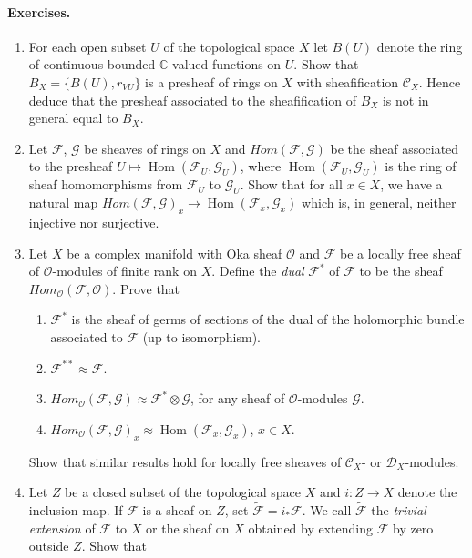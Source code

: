 \paragraph{Exercises.}
\begin{enumerate}
\item For each open subset $U$ of the topological space $X$ let $B(U)$ denote the ring of continuous bounded $\mathbb C$-valued functions on $U$. Show that $B_X=\{B(U),r_{VU}\}$ is a presheaf of rings on $X$ with sheafification $\mathcal C_X$. Hence deduce that the presheaf associated to the sheafification of $B_X$ is not in general equal to $B_X$.
\item Let $\mathcal F$, $\mathcal G$ be sheaves of rings on $X$ and $\mathit{Hom}(\mathcal F,\mathcal G)$ be the sheaf associated to the presheaf $U\mapsto\operatorname{Hom}(\mathcal F_U,\mathcal G_U)$, where $\operatorname{Hom}(\mathcal F_U,\mathcal G_U)$ is the ring of sheaf homomorphisms from $\mathcal F_U$ to $\mathcal G_U$. Show that for all $x\in X$, we have a natural map $\mathit{Hom}(\mathcal F,\mathcal G)_x\to\operatorname{Hom}(\mathcal F_x,\mathcal G_x)$ which is, in general, neither injective nor surjective.
\item Let $X$ be a complex manifold with Oka sheaf $\mathcal O$ and $\mathcal F$ be a locally free sheaf of $\mathcal O$-modules of finite rank on $X$. Define the \emph{dual} $\mathcal F^*$ of $\mathcal F$ to be the sheaf $\mathit{Hom}_{\mathcal O}(\mathcal F,\mathcal O)$. Prove that
\begin{enumerate}[label=\Alph*)]
\item $\mathcal F^*$ is the sheaf of germs of sections of the dual of the holomorphic bundle associated to $\mathcal F$ (up to isomorphism).
\item $\mathcal F^{**}\approx\mathcal F$.
\item $\mathit{Hom}_{\mathcal O}(\mathcal F,\mathcal G)\approx\mathcal F^*\otimes\mathcal G$, for any sheaf of $\mathcal O$-modules $\mathcal G$.
\item $\mathit{Hom}_{\mathcal O}(\mathcal F,\mathcal G)_x\approx\operatorname{Hom}(\mathcal F_x,\mathcal G_x)$, $x\in X$.
\end{enumerate}
Show that similar results hold for locally free sheaves of $\mathcal C_X$- or $\mathscr D_X$-modules.
\item Let $Z$ be a closed subset of the topological space $X$ and $i:Z\to X$ denote the inclusion map. If $\mathcal F$ is a sheaf on $Z$, set $\widetilde{\mathcal F}=i_*\mathcal F$. We call $\widetilde{\mathcal F}$ the \emph{trivial extension} of $\mathcal F$ to $X$ or the sheaf on $X$ obtained by extending $\mathcal F$ by zero outside $Z$. Show that

\end{enumerate}
